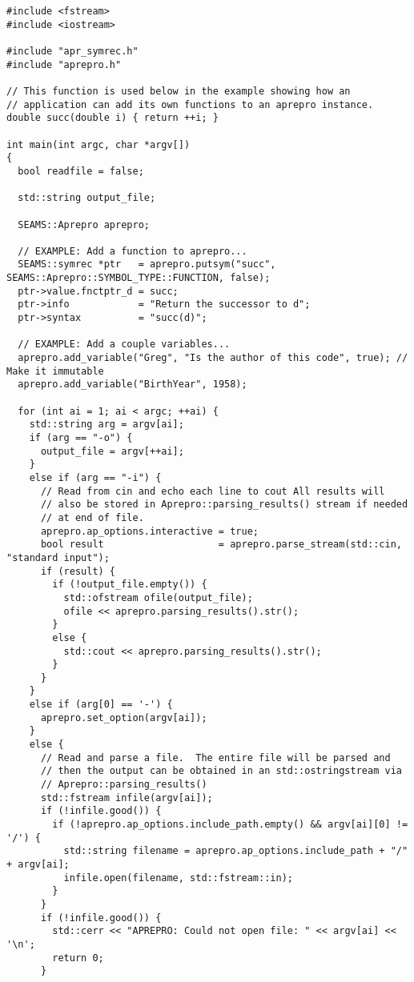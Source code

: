\begin{lstlisting}
#include <fstream>
#include <iostream>

#include "apr_symrec.h"
#include "aprepro.h"

// This function is used below in the example showing how an
// application can add its own functions to an aprepro instance.
double succ(double i) { return ++i; }

int main(int argc, char *argv[])
{
  bool readfile = false;

  std::string output_file;

  SEAMS::Aprepro aprepro;

  // EXAMPLE: Add a function to aprepro...
  SEAMS::symrec *ptr   = aprepro.putsym("succ", SEAMS::Aprepro::SYMBOL_TYPE::FUNCTION, false);
  ptr->value.fnctptr_d = succ;
  ptr->info            = "Return the successor to d";
  ptr->syntax          = "succ(d)";

  // EXAMPLE: Add a couple variables...
  aprepro.add_variable("Greg", "Is the author of this code", true); // Make it immutable
  aprepro.add_variable("BirthYear", 1958);

  for (int ai = 1; ai < argc; ++ai) {
    std::string arg = argv[ai];
    if (arg == "-o") {
      output_file = argv[++ai];
    }
    else if (arg == "-i") {
      // Read from cin and echo each line to cout All results will
      // also be stored in Aprepro::parsing_results() stream if needed
      // at end of file.
      aprepro.ap_options.interactive = true;
      bool result                    = aprepro.parse_stream(std::cin, "standard input");
      if (result) {
        if (!output_file.empty()) {
          std::ofstream ofile(output_file);
          ofile << aprepro.parsing_results().str();
        }
        else {
          std::cout << aprepro.parsing_results().str();
        }
      }
    }
    else if (arg[0] == '-') {
      aprepro.set_option(argv[ai]);
    }
    else {
      // Read and parse a file.  The entire file will be parsed and
      // then the output can be obtained in an std::ostringstream via
      // Aprepro::parsing_results()
      std::fstream infile(argv[ai]);
      if (!infile.good()) {
        if (!aprepro.ap_options.include_path.empty() && argv[ai][0] != '/') {
          std::string filename = aprepro.ap_options.include_path + "/" + argv[ai];
          infile.open(filename, std::fstream::in);
        }
      }
      if (!infile.good()) {
        std::cerr << "APREPRO: Could not open file: " << argv[ai] << '\n';
        return 0;
      }


\end{lstlisting}
